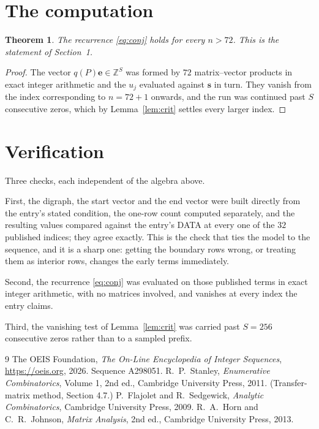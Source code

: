 \documentclass[11pt,a4paper]{article}
\theoremstyle{plain}
\newtheorem{theorem}{Theorem}
\theoremstyle{definition}
\begin{document}
\section{The computation}

\begin{theorem}
The recurrence \eqref{eq:conj} holds for every $n>72$. This is the statement of
Section~1.
\end{theorem}

\begin{proof}
The vector $q(P)\mathbf{e}\in\mathbb{Z}^{S}$ was formed by $72$ matrix--vector
products in exact integer arithmetic and the $u_j$ evaluated against $\mathbf{s}$ in turn.
They vanish from the index corresponding to $n=72+1$ onwards, and the run was continued
past $S$ consecutive zeros, which by Lemma~\ref{lem:crit} settles every larger index.
\end{proof}

\section{Verification}

Three checks, each independent of the algebra above.

First, the digraph, the start vector and the end vector were built directly from the
entry's stated condition, the one-row count computed separately, and the resulting values
compared against the entry's DATA at every one of the $32$ published indices; they
agree exactly. This is the check that ties the model to the sequence, and it is a sharp one:
getting the boundary rows wrong, or treating them as interior rows, changes the early terms
immediately.

Second, the recurrence \eqref{eq:conj} was evaluated on those published terms in exact
integer arithmetic, with no matrices involved, and vanishes at every index the entry claims.

Third, the vanishing test of Lemma~\ref{lem:crit} was carried past $S=256$ consecutive
zeros rather than to a sampled prefix.

\begin{thebibliography}{9}
 The OEIS Foundation, \emph{The On-Line Encyclopedia of Integer
Sequences}, \url{https://oeis.org}, 2026. Sequence A298051.
 R.~P.~Stanley, \emph{Enumerative Combinatorics}, Volume 1, 2nd ed.,
Cambridge University Press, 2011. (Transfer-matrix method, Section 4.7.)
 P.~Flajolet and R.~Sedgewick, \emph{Analytic Combinatorics}, Cambridge
University Press, 2009.
 R.~A.~Horn and C.~R.~Johnson, \emph{Matrix Analysis}, 2nd ed., Cambridge
University Press, 2013.
\end{thebibliography}
\end{document}
